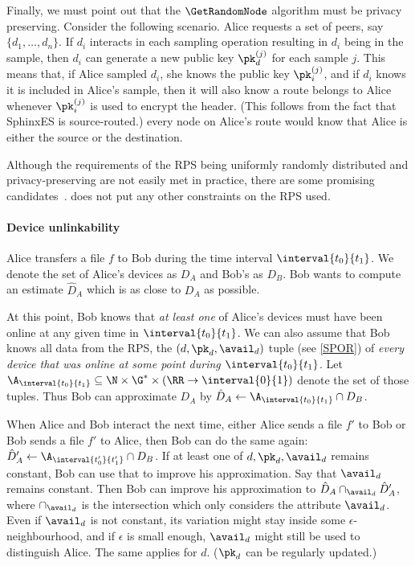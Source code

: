 Finally, we must point out that the \(\GetRandomNode\) algorithm must be 
privacy preserving.
Consider the following scenario.
Alice requests a set of peers, say \(\{d_1, \dotsc, d_n\}\).
If \(d_i\) interacts in each sampling operation resulting in \(d_i\) being in 
the sample, then \(d_i\) can generate a new public key \(\pk_d^{(j)}\) for each 
sample \(j\).
This means that, if Alice sampled \(d_i\), she knows the public key 
\(\pk_i^{(j)}\), and if \(d_i\) knows it is included in Alice's sample, then it 
will also know a route belongs to Alice whenever \(\pk_i^{(j)}\) is used to 
encrypt the header.
(This follows from the fact that SphinxES is source-routed.)
\Ie every node on Alice's route would know that Alice is either the source or 
the destination.

Although the requirements of the \ac{RPS} being uniformly randomly
distributed and privacy-preserving are not easily met in practice,
there are some promising candidates~\cite[\eg][]{Octopus,BrahmsRPS}.
\name does not put any other constraints on the \ac{RPS} used.

\paragraph*{Device unlinkability}

Alice transfers a file \(f\) to Bob during the time interval 
\(\interval{t_0}{t_1}\).
We denote the set of Alice's devices as \(D_A\) and Bob's as \(D_B\).
Bob wants to compute an estimate \(\hat D_A\) which is as close to \(D_A\) as 
possible.

At this point, Bob knows that \emph{at least one} of Alice's devices must have 
been online at any given time in \(\interval{t_0}{t_1}\).
We can also assume that Bob knows all data from the \ac{RPS}, \ie the \((d, 
  \pk_d, \avail_d)\) tuple (see \cref{SPOR}) of \emph{every device that was 
  online at some point during \(\interval{t_0}{t_1}\)}.
Let \(\A_{\interval{t_0}{t_1}}\subseteq \N\times \G^*\times (\RR\to 
  \interval{0}{1})\) denote the set of those tuples.
Thus Bob can approximate \(D_A\) by \(\hat D_A \gets 
  \A_{\interval{t_0}{t_1}}\cap D_B\).

When Alice and Bob interact the next time, either Alice sends a file \(f'\) to 
Bob or Bob sends a file \(f'\) to Alice, then Bob can do the same again:
\(\hat D_A' \gets \A_{\interval{t_0'}{t_1'}} \cap D_B\).
If at least one of \(d, \pk_d, \avail_d\) remains constant, Bob can use that to 
improve his approximation.
Say that \(\avail_d\) remains constant.
Then Bob can improve his approximation to \(\hat D_A \cap_{\avail_d} 
  \hat{D}_A'\), where \(\cap_{\avail_d}\) is the intersection which only 
considers the attribute \(\avail_d\).
Even if \(\avail_d\) is not constant, its variation might stay inside some 
\(\epsilon\)-neighbourhood, and if \(\epsilon\) is small enough, \(\avail_d\) 
might still be used to distinguish Alice.
The same applies for \(d\).
(\(\pk_d\) can be regularly updated.)

